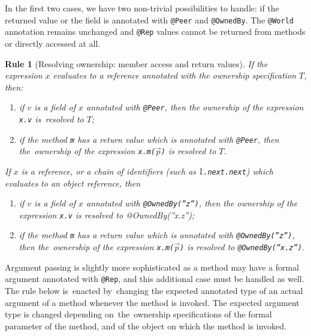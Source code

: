 \documentclass{pracamgr}
\theoremstyle{break}
\theoremstyle{break}
\theoremstyle{break}
\newtheorem{verrule}{Rule}
\begin{document}
In the first two cases, we have two non-trivial possibilities to
handle: if the returned value or the field is annotated with
\texttt{@Peer} and \texttt{@OwnedBy}. The \texttt{@World} annotation
remains unchanged and \texttt{@Rep} values cannot be returned from
methods or directly accessed at all.

\begin{verrule}[Resolving ownership: member access and return values]
  \label{vrl:res:acc}
  If the expression $x$ evaluates to a reference annotated with
  the ownership specification $T$, then:
  \begin{enumerate}[label=(\arabic*)]
  \item if $v$ is a field of $x$ annotated with \texttt{@Peer}, then
    the ownership of the expression \texttt{x.v} is~resolved to $T$;
  \item \label{pnt:peer-ret} if the method \texttt{m} has a return value which is annotated
    with \texttt{@Peer}, then the~ownership of the expression
    \texttt{x.m($\vec{p}$)} is resolved to $T$.
  \end{enumerate}
  If $x$ is a reference, or a chain of identifiers (such as
  \texttt{l.next.next}) which evaluates to an object reference, then
  \begin{enumerate}[label=(\arabic*), resume]
  \item if $v$ is a field of $x$ annotated with
    \texttt{@OwnedBy(''z'')}, then the ownership of the expression
    \texttt{x.v} is resolved to @OwnedBy(''x.z'');
  \item if the method \texttt{m} has a return value which is
    annotated with \texttt{@OwnedBy(''z'')}, then the~ownership of
    the expression \texttt{x.m($\vec{p}$)} is resolved to
    \texttt{@OwnedBy(''x.z'')}.
  \end{enumerate}
\end{verrule}

Argument passing is slightly more sophisticated as a method may have a
formal argument annotated with \texttt{@Rep}, and this additional case
must be handled as well. The rule below is~enacted by~changing the
expected annotated type of an actual argument of a method whenever the
method is invoked. The expected argument type is changed depending
on~the~ownership specifications of the formal parameter of the method,
and of the object on which the method is invoked.
\end{document}
